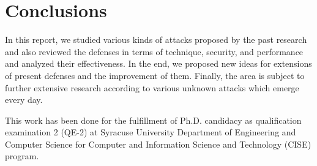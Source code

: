 \section{Conclusions}
In this report, we studied various kinds of attacks proposed by the past research and also reviewed the defenses in terms of technique, security, and performance and analyzed their effectiveness. In the end, we proposed new ideas for extensions of present defenses and the improvement of them. Finally, the area is subject to further extensive research according to various unknown attacks which emerge every day.

\begin{acks}
	
	This work has been done for the fulfillment of Ph.D. candidacy as qualification examination 2 (QE-2) at Syracuse University Department of Engineering and Computer Science for Computer and Information Science and Technology (CISE) program.
	
	
\end{acks}



